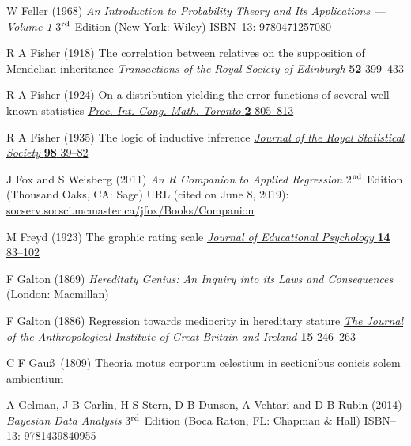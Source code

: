 \begin{thebibliography}{99}
W Feller
(1968) \textit{An Introduction to Probability Theory and Its 
Applications --- Volume 1} 3$^{\rm rd}$ Edition (New York: Wiley)
ISBN--13: 9780471257080

R A Fisher
(1918) The correlation between relatives on the supposition of 
Mendelian inheritance
\href{http://digital.library.adelaide.edu.au/dspace/bitstream/2440/15097/1/9.pdf}{\textit{Transactions of the Royal Society of 
Edinburgh} \textbf{52} 399--433}

R A Fisher
(1924) On a distribution yielding the error functions of several 
well known statistics
\href{http://www.mathunion.org/ICM/ICM1924.2/Main/icm1924.2.0805.0814.ocr.pdf}{\textit{Proc. Int. Cong. Math. Toronto} \textbf{2} 805--813}

R A Fisher
(1935) The logic of inductive inference
\href{http://www.jstor.org/stable/2342435}{\textit{Journal of the 
Royal Statistical Society} \textbf{98} 39--82}

J Fox and S Weisberg
(2011) \textit{An {R} Companion to Applied Regression}
2$^{\rm nd}$ Edition (Thousand Oaks, CA: Sage) URL (cited on
June 8, 2019): \href{http://socserv.socsci.mcmaster.ca/jfox/Books/Companion}{socserv.socsci.mcmaster.ca/jfox/Books/Companion}

M Freyd
(1923) The graphic rating scale 
\href{http://dx.doi.org/10.1037/h0074329}{\textit{Journal of 
Educational Psychology} \textbf{14} 83--102}

F Galton (1869) \textit{Hereditaty Genius: An Inquiry into its Laws 
and Consequences} (London: Macmillan)

F Galton
(1886) Regression towards mediocrity in hereditary stature 
\href{http://dx.doi.org/10.2307/2841583}{\textit{The Journal of the 
Anthropological Institute of Great Britain and Ireland}  \textbf{15} 
246--263}

C F Gau\ss\
(1809) Theoria motus corporum celestium in sectionibus conicis 
solem ambientium

A Gelman, J B Carlin, H S Stern, D B Dunson, A Vehtari and D B 
Rubin
(2014) \textit{Bayesian Data Analysis}
3$^{\rm rd}$ Edition (Boca Raton, FL: Chapman \& Hall)
ISBN--13: 9781439840955


\end{thebibliography}
